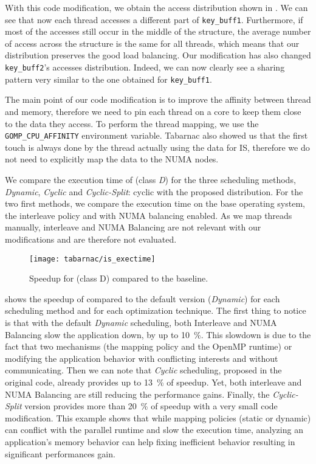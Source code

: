 With this code modification, we obtain the access distribution shown in .
We can see that now each thread accesses a different part of \texttt{key\_buff1}.
Furthermore, if most of the accesses still occur in the middle of the structure, the average number of access across the structure is the same for all threads, which means that our distribution preserves the good load balancing.
Our modification has also changed \texttt{key\_buff2}'s accesses distribution.
Indeed, we can now clearly see a sharing pattern very similar to the one obtained for \texttt{key\_buff1}.

The main point of our code modification is to improve the affinity between thread and memory, therefore we need to pin each thread on a core to keep them close to the data they access.
To perform the thread mapping, we use the \texttt{GOMP\_CPU\_AFFINITY} environment variable.
\gls{Tabarnac} also showed us that the first touch is always done by the thread actually using the data for IS, therefore we do not need to explicitly map the data to the \gls{NUMA} nodes.

We compare the execution time of \IS (class \emph{D}) for the three scheduling methods, \emph{Dynamic}, \emph{Cyclic} and \emph{Cyclic-Split}: cyclic with the proposed distribution.
For the two first methods, we compare the execution time on the base operating system, the interleave policy and with \gls{NUMA} balancing enabled.
As we map threads manually, interleave and \gls{NUMA} Balancing are not relevant with our modifications and are therefore not evaluated.

\begin{figure}[htb]
    \centering
    \texttt{[image: tabarnac/is\_exectime]}
    \caption[Speedup for \IS.]{Speedup for \IS (class D) compared to the baseline.}
\label{fig:is-res}
\end{figure}

 shows the speedup of \IS compared to the default version (\emph{Dynamic}) for each scheduling method and for each optimization technique.
The first thing to notice is that with the default \emph{Dynamic} scheduling, both Interleave and \gls{NUMA} Balancing slow the application down, by up to \SI{10}{\%}.
This slowdown is due to the fact that two mechanisms (the mapping policy and the \gls{OpenMP} runtime) or modifying the application behavior with conflicting interests and without communicating.
Then we can note that \emph{Cyclic} scheduling, proposed in the original code, already provides up to \SI{13}{\%} of speedup.
Yet, both interleave and \gls{NUMA} Balancing are still reducing the performance gains.
Finally, the \emph{Cyclic-Split} version provides more than \SI{20}{\%} of speedup with a very small code modification.
This example shows that while mapping policies (static or dynamic) can conflict with the parallel runtime and slow the execution time, analyzing an application's memory behavior can help fixing inefficient behavior resulting in significant performances gain.

